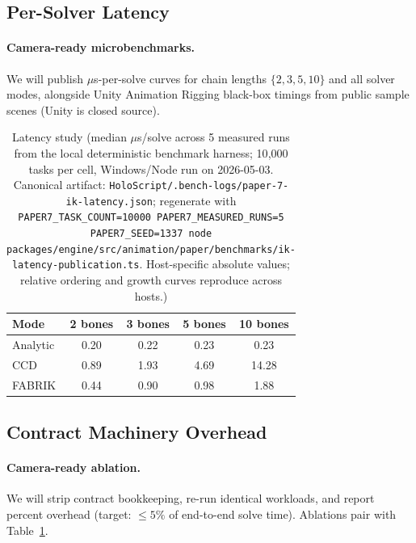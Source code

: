 \documentclass[sigconf,nonacm]{acmart}
\newcommand{\fabrik}{\textsc{FABRIK}}
\newcommand{\ccd}{\textsc{CCD}}
\providecommand{\measuredFrom}[1]{}
\begin{document}
\subsection{Per-Solver Latency}
\label{sec:eval:latency}
\paragraph{Camera-ready microbenchmarks.}
We will publish $\mu$s-per-solve curves for chain lengths
$\{2,3,5,10\}$ and all solver modes, alongside Unity Animation Rigging
black-box timings from public sample scenes (Unity is closed source).

\begin{table}[t]
  \centering
  \caption{Latency study (median $\mu$s/solve across 5 measured runs from the local deterministic benchmark harness; 10{,}000 tasks per cell, Windows/Node run on 2026-05-03. Canonical artifact: \texttt{HoloScript/.bench-logs/paper-7-ik-latency.json}; regenerate with \texttt{PAPER7\_TASK\_COUNT=10000 PAPER7\_MEASURED\_RUNS=5 PAPER7\_SEED=1337 node packages/engine/src/animation/paper/benchmarks/ik-latency-publication.ts}. Host-specific absolute values; relative ordering and growth curves reproduce across hosts.)}
  \label{tab:overhead}
  \footnotesize
  \measuredFrom{HoloScript/.bench-logs/paper-7-ik-latency.json}%
  \measuredFrom{HoloScript/packages/engine/src/animation/paper/benchmarks/ik-latency-publication.ts}%
  \begin{tabular}{@{}lcccc@{}}
    \toprule
    \textbf{Mode} & \textbf{2 bones} & \textbf{3 bones} & \textbf{5 bones} & \textbf{10 bones} \\
    \midrule
    Analytic & 0.20 & 0.22 & 0.23 & 0.23 \\
    \ccd{} & 0.89 & 1.93 & 4.69 & 14.28 \\
    \fabrik{} & 0.44 & 0.90 & 0.98 & 1.88 \\
    \bottomrule
  \end{tabular}
\end{table}

\subsection{Contract Machinery Overhead}
\paragraph{Camera-ready ablation.}
We will strip contract bookkeeping, re-run identical workloads, and report
percent overhead (target: $\leq 5\%$ of end-to-end solve time). Ablations pair with Table~\ref{tab:overhead}.
\end{document}
